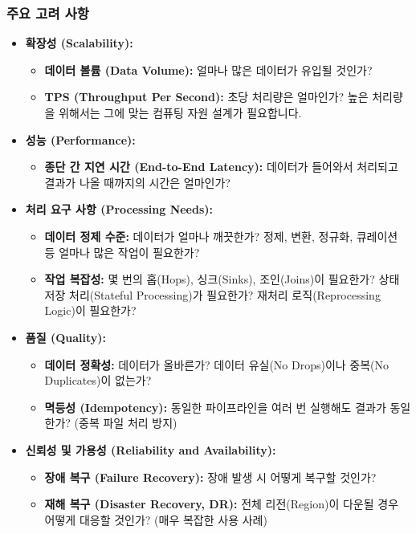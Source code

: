 \documentclass[11pt,a4paper]{article}
\begin{document}
\subsubsection{주요 고려 사항}
\begin{itemize}
    \item \textbf{확장성 (Scalability):}
    \begin{itemize}
        \item \textbf{데이터 볼륨 (Data Volume):} 얼마나 많은 데이터가 유입될 것인가?
        \item \textbf{TPS (Throughput Per Second):} 초당 처리량은 얼마인가? 높은 처리량을 위해서는 그에 맞는 컴퓨팅 자원 설계가 필요합니다.
    \end{itemize}
    \item \textbf{성능 (Performance):}
    \begin{itemize}
        \item \textbf{종단 간 지연 시간 (End-to-End Latency):} 데이터가 들어와서 처리되고 결과가 나올 때까지의 시간은 얼마인가?
    \end{itemize}
    \item \textbf{처리 요구 사항 (Processing Needs):}
    \begin{itemize}
        \item \textbf{데이터 정제 수준:} 데이터가 얼마나 깨끗한가? 정제, 변환, 정규화, 큐레이션 등 얼마나 많은 작업이 필요한가?
        \item \textbf{작업 복잡성:} 몇 번의 홉(Hops), 싱크(Sinks), 조인(Joins)이 필요한가? 상태 저장 처리(Stateful Processing)가 필요한가? 재처리 로직(Reprocessing Logic)이 필요한가?
    \end{itemize}
    \item \textbf{품질 (Quality):}
    \begin{itemize}
        \item \textbf{데이터 정확성:} 데이터가 올바른가? 데이터 유실(No Drops)이나 중복(No Duplicates)이 없는가?
        \item \textbf{멱등성 (Idempotency):} 동일한 파이프라인을 여러 번 실행해도 결과가 동일한가? (중복 파일 처리 방지)
    \end{itemize}
    \item \textbf{신뢰성 및 가용성 (Reliability and Availability):}
    \begin{itemize}
        \item \textbf{장애 복구 (Failure Recovery):} 장애 발생 시 어떻게 복구할 것인가?
        \item \textbf{재해 복구 (Disaster Recovery, DR):} 전체 리전(Region)이 다운될 경우 어떻게 대응할 것인가? (매우 복잡한 사용 사례)
    \end{itemize}
\end{itemize}
\end{document}
